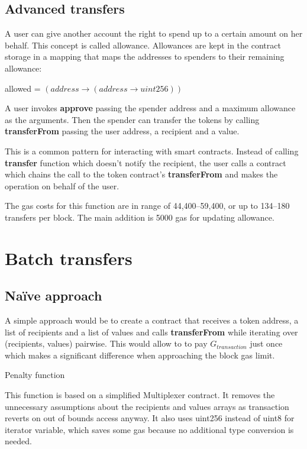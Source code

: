 \documentclass[12pt]{article}
\begin{document}
\subsection{Advanced transfers}

A user can give another account the right to spend up to a certain amount on her behalf. This concept is called allowance. Allowances are kept in the contract storage in a mapping that maps the addresses to spenders to their remaining allowance:
\begin{center}
	allowed = $(address \rightarrow (address \rightarrow uint256))$
\end{center}

A user invokes \textbf{approve} passing the spender address and a maximum allowance as the arguments.
Then the spender can transfer the tokens by calling \textbf{transferFrom} passing the user address, a recipient and a value.

This is a common pattern for interacting with smart contracts.
Instead of calling \textbf{transfer} function which doesn't notify the recipient, the user calls a contract which chains the call to the token contract's \textbf{transferFrom} and makes the operation on behalf of the user.

The gas costs for this function are in range of 44,400--59,400, or up to 134--180 transfers per block. The main addition is 5000 gas for updating allowance.

\section{Batch transfers}
\subsection{Naïve approach}

A simple approach would be to create a contract that receives a token address, a list of recipients and a list of values and calls \textbf{transferFrom} while iterating over (recipients, values) pairwise. This would allow to to pay $G_{transaction}$ just once which makes a significant difference when approaching the block gas limit.

\begin{algorithm}[h]
\caption{Penalty function}
\BlankLine
\For{$i \in [0 \dots \text{recipients.length})$}{
	require(token.transferFrom(sender, recipients[i], values[i]))
}
\end{algorithm}
%
This function is based on a simplified Multiplexer contract\cite{multiplexer}.
It removes the unnecessary assumptions about the recipients and values arrays as transaction reverts on out of bounds access anyway\cite{solidity-errors}.
It also uses uint256 instead of uint8 for iterator variable, which saves some gas because no additional type conversion is needed.
\end{document}
